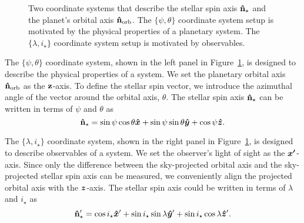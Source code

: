 \documentclass[twocolumn,times]{aastex631}
\begin{document}
\begin{figure*}[ht!]
    \vspace*{-1cm}
    \caption{Two coordinate systems that describe the stellar spin axis $\vb{\hat{n}_\star}$ and the planet's orbital axis $\vb{\hat{n}_{\rm orb}}$. The $\{\psi, \theta\}$ coordinate system setup is motivated by the physical properties of a planetary system. The $\{\lambda, i_\star\}$ coordinate system setup is motivated by observables.}
    \label{fig:coord}
\end{figure*}

The $\{\psi, \theta\}$ coordinate system, shown in the left panel in Figure~\ref{fig:coord}, is designed to describe the physical properties of a system. We set the planetary orbital axis $\vb{\hat{n}_{\rm orb}}$ as the $\vb{z}$-axis.
To define the stellar spin vector, we introduce the azimuthal angle of the vector around the orbital axis, $\theta$. 
The stellar spin axis $\vb{\hat{n}_\star}$ can be written in terms of $\psi$ and $\theta$ as
\begin{equation}
    \vb{\hat{n}_\star} = \sin{\psi}\cos{\theta}\vu*{x} + \sin{\psi}\sin{\theta}\vu*{y} + \cos{\psi}\vu*{z}.
\end{equation}

The $\{\lambda, i_\star\}$ coordinate system, shown in the right panel in Figure~\ref{fig:coord}, is designed to describe observables of a system. We set the observer's light of sight as the $\vb*{x'}$-axis.
Since only the difference between the sky-projected orbital axis and the sky-projected stellar spin axis can be measured, we conveniently align the projected orbital axis with the $\vb*{z}$-axis.
The stellar spin axis could be written in terms of $\lambda$ and $i_\star$ as 
\begin{equation}\label{eqn:nstar1}
    \vb{\hat{n}_\star}' = \cos{i_\star}\vu*{x}' + \sin{i_\star}\sin{\lambda}\vu*{y}' + \sin{i_\star}\cos{\lambda}\vu*{z}'.
\end{equation}
\end{document}
